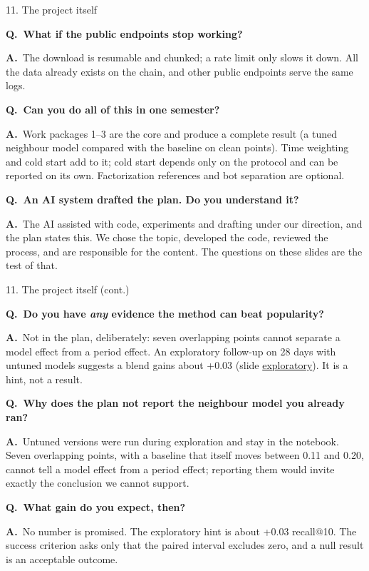 \documentclass[aspectratio=169,10pt]{beamer}
\newcommand{\Q}[1]{\par{\color{orange}\bfseries Q.\ #1}\par\smallskip}
\newcommand{\A}{{\color{teal}\bfseries A.}\ }
\newcommand{\toindex}{\hfill\hyperlink{index}{\beamerreturnbutton{index}}}
\newcommand{\qsep}{\par\medskip{\color{grey!40}\hrule}\medskip}
\begin{document}
\begin{frame}[label=qproj]{11. The project itself \toindex}
  \footnotesize
  \Q{What if the public endpoints stop working?}
  \A The download is resumable and chunked; a rate limit only slows it down. All the data already exists on the chain, and other public endpoints serve the same logs.
  \qsep
  \Q{Can you do all of this in one semester?}
  \A Work packages 1--3 are the core and produce a complete result (a tuned neighbour model compared with the baseline on clean points). Time weighting and cold start add to it; cold start depends only on the protocol and can be reported on its own. Factorization references and bot separation are optional.
  \qsep
  \Q{An AI system drafted the plan. Do you understand it?}
  \A The AI assisted with code, experiments and drafting under our direction, and the plan states this. We chose the topic, developed the code, reviewed the process, and are responsible for the content. The questions on these slides are the test of that.
\end{frame}

\begin{frame}{11. The project itself (cont.) \toindex}
  \footnotesize
  \Q{Do you have \emph{any} evidence the method can beat popularity?}
  \A Not in the plan, deliberately: seven overlapping points cannot separate a model effect from a period effect. An exploratory follow-up on 28 days with untuned models suggests a blend gains about +0.03 (slide \hyperlink{explor}{exploratory}). It is a hint, not a result.
  \qsep
  \Q{Why does the plan not report the neighbour model you already ran?}
  \A Untuned versions were run during exploration and stay in the notebook. Seven overlapping points, with a baseline that itself moves between 0.11 and 0.20, cannot tell a model effect from a period effect; reporting them would invite exactly the conclusion we cannot support.
  \qsep
  \Q{What gain do you expect, then?}
  \A No number is promised. The exploratory hint is about +0.03 recall@10. The success criterion asks only that the paired interval excludes zero, and a null result is an acceptable outcome.
\end{frame}
\end{document}
